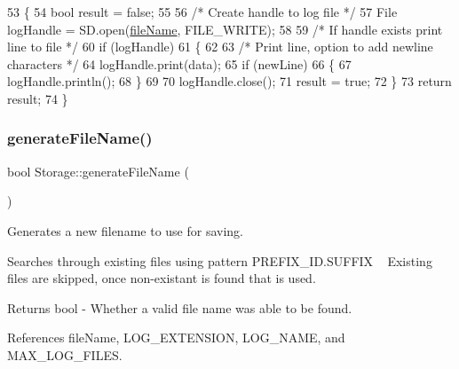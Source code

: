 \begin{DoxyCode}
53 \{
54   \textcolor{keywordtype}{bool} result = \textcolor{keyword}{false};
55 
56   \textcolor{comment}{/* Create handle to log file */}
57   File logHandle = SD.open(\hyperlink{class_storage_a7c3e886a0b8395c2045ab4f7e04481e1}{fileName}, FILE\_WRITE);
58 
59   \textcolor{comment}{/* If handle exists print line to file */}
60   \textcolor{keywordflow}{if} (logHandle)
61   \{
62 
63     \textcolor{comment}{/* Print line, option to add newline characters */}
64     logHandle.print(data);
65     \textcolor{keywordflow}{if} (newLine)
66     \{
67       logHandle.println();
68     \}
69 
70     logHandle.close();
71     result = \textcolor{keyword}{true};
72   \}
73   \textcolor{keywordflow}{return} result;
74 \}
\end{DoxyCode}
\mbox{\label{class_storage_a571ce9630665d9407ffbaeff55c47b0a}} 
\subsubsection{\texorpdfstring{generate\+File\+Name()}{generateFileName()}}
{\footnotesize\ttfamily bool Storage\+::generate\+File\+Name (\begin{DoxyParamCaption}{ }\end{DoxyParamCaption})}



Generates a new filename to use for saving. 

Searches through existing files using pattern P\+R\+E\+F\+I\+X\+\_\+\+I\+D.\+S\+U\+F\+F\+IX ~\newline
Existing files are skipped, once non-\/existant is found that is used.

\begin{DoxyReturn}{Returns}
bool -\/ Whether a valid file name was able to be found. 
\end{DoxyReturn}


References file\+Name, L\+O\+G\+\_\+\+E\+X\+T\+E\+N\+S\+I\+ON, L\+O\+G\+\_\+\+N\+A\+ME, and M\+A\+X\+\_\+\+L\+O\+G\+\_\+\+F\+I\+L\+ES.


